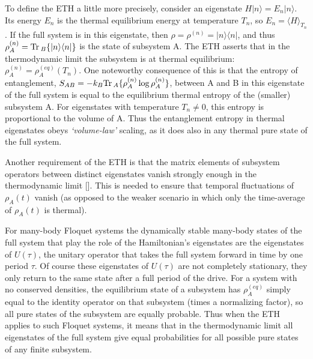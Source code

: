 \documentclass[amsmath,onecolumn, superscriptaddress,preprint,aps]{revtex4}
\newcommand{\Tr}{{\rm Tr}\,}
\renewcommand{\cite}[1]{[\onlinecite{#1}]}
\begin{document}
To define the ETH a little more precisely, consider an eigenstate $H|n\rangle=E_n|n\rangle$.  Its energy $E_n$ is the thermal equilibrium energy at temperature $T_n$, so $E_n=\langle H\rangle_{T_n}$.  If the full system is in this eigenstate, then $\rho=\rho^{(n)}=|n\rangle\langle n|$, and thus
$\rho_A^{(n)}=\Tr_B\{|n\rangle\langle n|\}$ is the state of subsystem A.  The ETH asserts that in the thermodynamic limit the subsystem is at thermal equilibrium: $\rho_A^{(n)}=\rho_A^{(eq)}(T_n)$.  One noteworthy consequence of this is that the entropy of entanglement,  $S_{AB}=-k_B\Tr_A\{\rho_A^{(n)}\log\rho_A^{(n)}\}$, between A and B in this eigenstate of the full system is equal to the equilibrium thermal entropy of the (smaller) subsystem A.  For eigenstates with temperature $T_n \neq 0$, this entropy is proportional to the volume of A.  Thus the entanglement entropy in thermal eigenstates obeys {\it `volume-law'} scaling, as it does also in any thermal pure state of the full system.

Another requirement of the ETH is that the matrix elements of
 subsystem operators between distinct eigenstates vanish strongly enough in the thermodynamic limit
\cite{Rigol, ETH4}.  This is needed to ensure that temporal fluctuations of $\rho_A(t)$ vanish
(as opposed to the weaker scenario in which only the time-average of $\rho_A(t)$ is thermal).

For many-body Floquet systems
the dynamically stable many-body states of the full system that play the role of the Hamiltonian's eigenstates are the eigenstates of $U(\tau)$, the unitary operator
that takes the full system forward in time by one period $\tau$.  Of course these eigenstates of $U(\tau)$ are not completely stationary, they only return to
the same state after a full period of the drive.  For a system with no conserved densities, the equilibrium state of a subsystem has $\rho_A^{(eq)}$ simply equal
to the identity operator on that subsystem (times a normalizing factor), so all %
pure states of the subsystem are equally probable.   Thus when the ETH applies to such Floquet systems, it means that in the thermodynamic limit all eigenstates of the full system give equal probabilities for all possible pure states of any finite subsystem.
\end{document}
